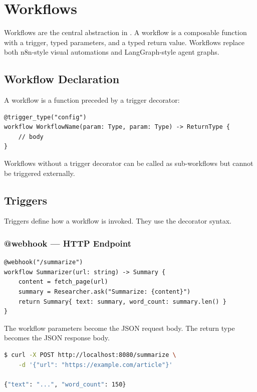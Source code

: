 \chapter{Workflows}
\label{ch:workflows}

Workflows are the central abstraction in \haira{}. A workflow is a composable function with a trigger, typed parameters, and a typed return value. Workflows replace both n8n-style visual automations and LangGraph-style agent graphs.

\section{Workflow Declaration}

A workflow is a function preceded by a trigger decorator:

\begin{lstlisting}
@trigger_type("config")
workflow WorkflowName(param: Type, param: Type) -> ReturnType {
    // body
}
\end{lstlisting}

Workflows without a trigger decorator can be called as sub-workflows but cannot be triggered externally.

\section{Triggers}

Triggers define how a workflow is invoked. They use the  decorator syntax.

\subsection{@webhook --- HTTP Endpoint}

\begin{lstlisting}
@webhook("/summarize")
workflow Summarizer(url: string) -> Summary {
    content = fetch_page(url)
    summary = Researcher.ask("Summarize: {content}")
    return Summary{ text: summary, word_count: summary.len() }
}
\end{lstlisting}

The workflow parameters become the JSON request body. The return type becomes the JSON response body.

\begin{lstlisting}[language=bash,numbers=none]
$ curl -X POST http://localhost:8080/summarize \
    -d '{"url": "https://example.com/article"}'

{"text": "...", "word_count": 150}
\end{lstlisting}

